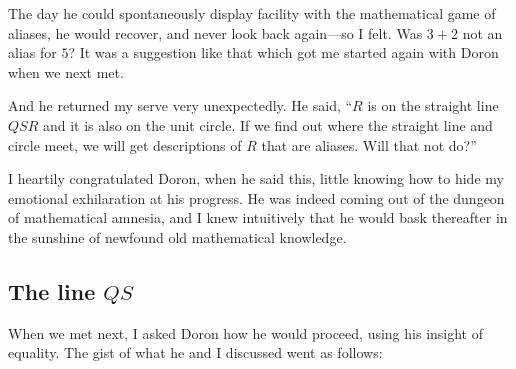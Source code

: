 \documentclass[
  a4paper,
]{article}
\begin{document}
The day he could spontaneously display facility with the mathematical
game of aliases, he would recover, and never look back again---so I
felt. Was \(3 + 2\) not an alias for \(5\)? It was a suggestion like
that which got me started again with Doron when we next met.

And he returned my serve very unexpectedly. He said, ``\(R\) is on the
straight line \(QSR\) and it is also on the unit circle. If we find out
where the straight line and circle meet, we will get descriptions of
\(R\) that are aliases. Will that not do?''

I heartily congratulated Doron, when he said this, little knowing how to
hide my emotional exhilaration at his progress. He was indeed coming out
of the dungeon of mathematical amnesia, and I knew intuitively that he
would bask thereafter in the sunshine of newfound old mathematical
knowledge.

\subsection{\texorpdfstring{The line
\(QS\)}{The line QS}}\label{the-line-qs}

When we met next, I asked Doron how he would proceed, using his insight
of equality. The gist of what he and I discussed went as follows:
\end{document}
